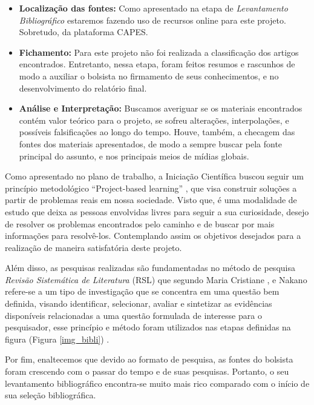 \begin{itemize}
\item \textbf{Localização das fontes:} Como apresentado na etapa de  \textit{Levantamento Bibliográfico} estaremos fazendo uso de recursos online para este projeto. Sobretudo, da plataforma CAPES.

\item \textbf{Fichamento:} Para este projeto não foi realizada a classificação dos artigos encontrados. Entretanto, nessa etapa, foram feitos resumos e rascunhos de modo a auxiliar o bolsista no firmamento de seus conhecimentos, e no desenvolvimento do relatório final.

\item \textbf{Análise e Interpretação:} Buscamos averiguar se os materiais encontrados contém valor teórico para o projeto, se sofreu alterações, interpolações, e possíveis falsificações ao longo do tempo. Houve, também, a checagem das fontes dos materiais apresentados, de modo a sempre buscar pela fonte principal do assunto, e nos principais meios de mídias globais.


\end{itemize}

 
Como apresentado no plano de trabalho, a Iniciação Científica buscou seguir um princípio metodológico “Project-based learning” \cite{krajcik2006project}, que visa construir soluções a partir de problemas reais em nossa sociedade. Visto que, é uma modalidade de estudo que deixa as pessoas envolvidas livres para seguir a sua curiosidade, desejo de resolver os problemas encontrados pelo caminho e de buscar por mais informações para resolvê-los. Contemplando assim os objetivos desejados para a realização de maneira satisfatória deste projeto. 

Além disso, as pesquisas realizadas são fundamentadas no método de pesquisa \textit{Revisão Sistemática de Literatura} (RSL) que segundo Maria Cristiane \cite{revi3}, e Nakano \cite{revi2} refere-se a um tipo de investigação que se concentra em uma questão bem definida, visando identificar, selecionar, avaliar e sintetizar as evidências disponíveis relacionadas a uma questão formulada de interesse para o pesquisador, esse princípio e método foram utilizados nas etapas definidas na figura (Figura \ref{img_bibli}) .

Por fim, enaltecemos que devido ao formato de pesquisa, as fontes do bolsista foram crescendo com o passar do tempo e de suas pesquisas. Portanto, o seu levantamento bibliográfico encontra-se muito mais rico comparado com o início de sua seleção bibliográfica.


